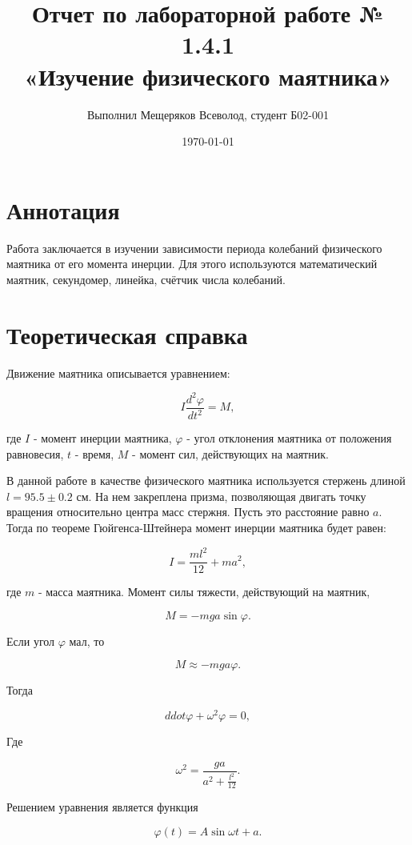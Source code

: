 \documentclass[a4paper,12pt]{report}
\author{Выполнил Мещеряков Всеволод, студент Б02-001}
\title{Отчет по лабораторной работе № 1.4.1 \\[15pt] «Изучение физического маятника»}
\date{\today}
\begin{document}
\maketitle

\section*{\Large Аннотация}

Работа заключается в изучении зависимости периода колебаний физического маятника от его момента инерции. Для этого используются математический маятник, секундомер, линейка, счётчик числа колебаний.

\section*{Теоретическая справка}

Движение маятника описывается уравнением:

\begin{equation}
	I \frac{d^2 \varphi}{dt^2}=M,
	\label{form1}
\end{equation}

где $I$ - момент инерции маятника, $\varphi$ - угол отклонения маятника от положения равновесия, $t$ - время, $M$ - момент сил, действующих на маятник.

В данной работе в качестве физического маятника используется стержень длиной $ l = 95.5 \pm 0.2 $ см. На нем закреплена призма, позволяющая двигать точку вращения относительно центра масс стержня. Пусть это расстояние равно $a$. Тогда по теореме Гюйгенса-Штейнера момент инерции маятника будет равен:

\begin{equation}
	I = \frac{ml^2}{12} + ma^2,
	\label{form2}
\end{equation}

где $m$ - масса маятника. Момент силы тяжести, действующий на маятник, 

\[ M = -mga \sin{\varphi}. \]

Если угол $\varphi$ мал, то 

\[ M \approx -mga\varphi. \]

Тогда

\[ ddot{\varphi} + \omega^2 \varphi = 0, \]

Где

\[ \omega^2=\frac{ga}{a^2+\frac{l^2}{12}}. \]

Решением уравнения является функция

\begin{equation}
	\varphi(t)=A\sin{\omega t + a}.
	\label{form3}
\end{equation}
\end{document}
